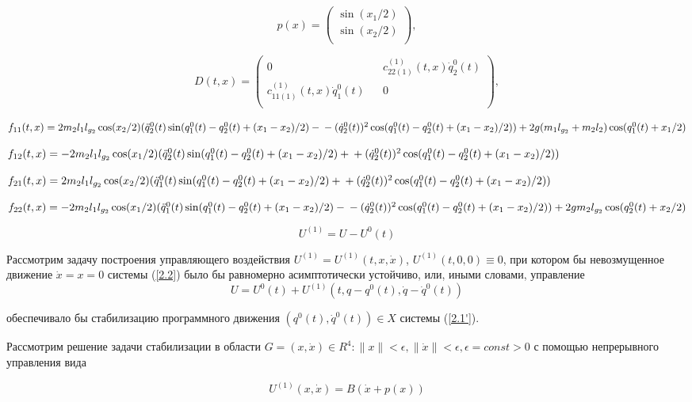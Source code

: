 $$p(x) =
\begin{pmatrix}
\sin(x_1/2) \\
\sin(x_2/2)\\
\end{pmatrix},$$

$$D(t, x) =
\begin{pmatrix}
0 && c_{22(1)}^{(1)}(t,x) \dot q_2^0(t) \\
c_{11(1)}^{(1)}(t,x) \dot q_1^0(t) && 0 \\
\end{pmatrix},$$

$f_{11}(t,x) = 2m_2l_1l_{g_2} \cos(x_2/2) (\ddot q_2^0(t) \sin(q_1^0(t) - q_2^0(t) + (x_1 - x_2)/2) - \\ - (\dot q_2^0(t))^2 \cos(q_1^0(t) - q_2^0(t) + (x_1 - x_2)/2)) + 2g(m_1 l_{g_2} + m_2 l_2) \cos(q_1^0(t) + x_1/2)$

$f_{12}(t,x) = - 2 m_2 l_1 l_{g_2} \cos(x_1/2) (\ddot q_2^0(t) \sin(q_1^0(t) - q_2^0(t) + (x_1 - x_2)/2) + \\ + (\dot q_2^0(t))^2 \cos(q_1^0(t) - q_2^0(t) + (x_1 - x_2)/2))$

$f_{21}(t,x) = 2 m_2 l_1 l_{g_2} \cos(x_2/2) (\ddot q_1^0(t) \sin(q_1^0(t) - q_2^0(t) + (x_1 - x_2)/2) + \\ + (\dot q_2^0(t))^2 \cos(q_1^0(t) - q_2^0(t) + (x_1 - x_2)/2))$

$f_{22}(t,x) = - 2m_2 l_1 l_{g_2} \cos(x_1/2) (\ddot q_1^0(t) \sin(q_1^0(t) - q_2^0(t) + (x_1 - x_2)/2) - \\ - (\dot q_2^0(t))^2 \cos(q_1^0(t) - q_2^0(t) + (x_1 - x_2)/2)) + 2 g m_2 l_{g_2} \cos(q_2^0(t) + x_2/2)$

$$ U^{(1)} = U - U^{0}(t) $$

Рассмотрим задачу построения управляющего воздействия  $ U^{(1)} = U^{(1)}(t, x, \dot x) $, $ U^{(1)} (t, 0, 0) \equiv 0 $, при котором бы невозмущенное движение $\dot x = x = 0$  системы (\ref{2.2}) было бы равномерно асимптотически устойчиво, или, иными словами, управление $$U = U^0(t) + U^{(1)}(t, q-q^0(t), \dot q - \dot q^0(t))$$

обеспечивало бы стабилизацию программного движения $(q^0(t), \dot q^0(t)) \in X$  системы (\ref{2.1'}).

Рассмотрим решение задачи стабилизации в области 
$G = {(x, \dot x) \in R^4 : \|x\|<\epsilon, \|\dot x\|<\epsilon, \epsilon=const>0}$
с помощью непрерывного управления вида

$$U^{(1)}(x, \dot x) = B(\dot x + p(x))$$ \label{2.3'}     

